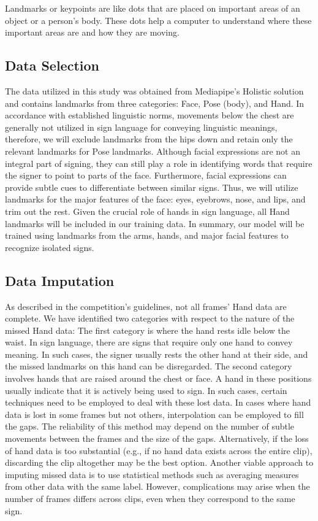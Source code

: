 \documentclass[10pt,twocolumn,letterpaper]{article}
\begin{document}
\begin{CJK*}{UTF8}{bsmi}
Landmarks or keypoints are like dots that are placed on important areas of an object or a person's body. 
These dots help a computer to understand where these important areas are and how they are moving.

\subsection{Data Selection}
{\color{blue} 
The data utilized in this study was obtained from Mediapipe’s Holistic solution and contains landmarks from three categories: Face, Pose (body), and Hand.
In accordance with established linguistic norms, movements below the chest are generally not utilized in sign language for conveying linguistic meanings, therefore, we will exclude landmarks from the hips down and retain only the relevant landmarks for Pose landmarks. Although facial expressions are not an integral part of signing, they can still play a role in identifying words that require the signer to point to parts of the face. Furthermore, facial expressions can provide subtle cues to differentiate between similar signs. Thus, we will utilize landmarks for the major features of the face: eyes, eyebrows, nose, and lips, and trim out the rest. Given the crucial role of hands in sign language, all Hand landmarks will be included in our training data. In summary, our model will be trained using landmarks from the arms, hands, and major facial features to recognize isolated signs.
}

\subsection{Data Imputation}
{\color{blue} 

As described in the competition’s guidelines, not all frames’ Hand data are complete. We have identified two categories with respect to the nature of the missed Hand data:
The first category is where the hand rests idle below the waist. In sign language, there are signs that require only one hand to convey meaning. In such cases, the signer usually rests the other hand at their side, and the missed landmarks on this hand can be disregarded.
The second category involves hands that are raised around the chest or face. A hand in these positions usually indicate that it is actively being used to sign. In such cases, certain techniques need to be employed to deal with these lost data. In cases where hand data is lost in some frames but not others, interpolation can be employed to fill the gaps. The reliability of this method may depend on the number of subtle movements between the frames and the size of the gaps. Alternatively, if the loss of hand data is too substantial (e.g., if no hand data exists across the entire clip), discarding the clip altogether may be the best option. Another viable approach to imputing missed data is to use statistical methods such as averaging measures from other data with the same label. However, complications may arise when the number of frames differs across clips, even when they correspond to the same sign.

}
\end{CJK*}
\end{document}
